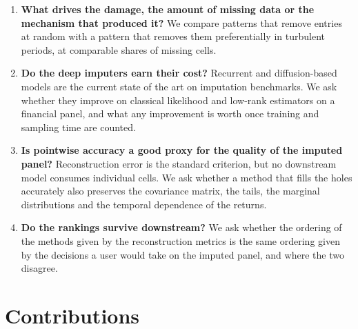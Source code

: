 \begin{enumerate}
    \item \textbf{What drives the damage, the amount of missing data or the
    mechanism that produced it?} We compare patterns that remove entries at
    random with a pattern that removes them preferentially in turbulent
    periods, at comparable shares of missing cells.

    \item \textbf{Do the deep imputers earn their cost?} Recurrent and
    diffusion-based models are the current state of the art on imputation
    benchmarks. We ask whether they improve on classical likelihood and
    low-rank estimators on a financial panel, and what any improvement is
    worth once training and sampling time are counted.

    \item \textbf{Is pointwise accuracy a good proxy for the quality of the
    imputed panel?} Reconstruction error is the standard criterion, but no
    downstream model consumes individual cells. We ask whether a method that
    fills the holes accurately also preserves the covariance matrix, the
    tails, the marginal distributions and the temporal dependence of the
    returns.

    \item \textbf{Do the rankings survive downstream?} We ask whether the
    ordering of the methods given by the reconstruction metrics is the same
    ordering given by the decisions a user would take on the imputed panel,
    and where the two disagree.
\end{enumerate}

\section{Contributions}
\label{sec:contributions}

